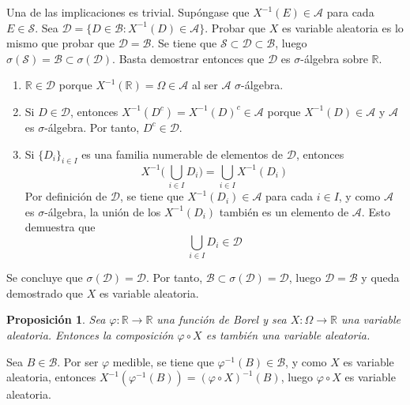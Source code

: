 \documentclass[11pt]{report}
\makeatletter
\renewenvironment{proof}[1][\proofname]{\par
  \pushQED{\qed}%
  \normalfont \topsep\z@skip %
  \trivlist
  \item[\hskip\labelsep
        \itshape
    #1\@addpunct{.}]\ignorespaces
}{%
  \popQED\endtrivlist\@endpefalse
}
\theoremstyle{mytheorem}
\newtheorem{proposition}{Proposición}
\theoremstyle{mydefinition}
\theoremstyle{myexample}
\let\oldproofname=\proofname
\renewcommand{\proofname}{\rm\bf{\oldproofname}}}
\newenvironment{cproposition} %
  {\begin{mdframed}[
        linewidth=3pt,
        linecolor=c2,
        bottomline=false,
        topline=false,
        rightline=false,
        innerrightmargin=0pt,
        innertopmargin=0pt,
        innerbottommargin=0pt,
        innerleftmargin=1em,
        skipabove=\baselineskip]
    \begin{proposition}}
  {\end{proposition}\end{mdframed}}
\newcommand{\R}{\mathbb R}
\makeatother
\begin{document}
\begin{proof}
Una de las implicaciones es trivial. Supóngase que $X^{-1}(E) \in \mathcal{A}$ para cada $E \in \mathcal{S}$. Sea $\mathcal{D} = \{D \in \mathcal{B} \colon X^{-1}(D) \in \mathcal{A}\}$. Probar que $X$ es variable aleatoria es lo mismo que probar que $\mathcal{D} = \mathcal{B}$. Se tiene que $\mathcal{S} \subset \mathcal{D} \subset \mathcal{B}$, luego $\sigma(\mathcal{S}) = \mathcal{B} \subset \sigma(\mathcal{D})$. Basta demostrar entonces que $\mathcal{D}$ es $\sigma$-álgebra sobre $\R$. 

\begin{enumerate}
    \item $\R \in \mathcal{D}$ porque $X^{-1}(\R) = \Omega \in \mathcal{A}$ al ser $\mathcal{A}$ $\sigma$-álgebra.
    \item Si $D \in \mathcal{D}$, entonces $X^{-1}(D^c) = X^{-1}(D)^c \in \mathcal{A}$ porque $X^{-1}(D) \in \mathcal{A}$ y $\mathcal{A}$ es $\sigma$-álgebra. Por tanto, $D^c \in \mathcal{D}$.
    \item Si $\{D_i\}_{i \in I}$ es una familia numerable de elementos de $\mathcal{D}$, entonces
    \[X^{-1}\biggl(\, \bigcup_{i \in I} D_i \biggr) = \bigcup_{i \in I}X^{-1}(D_i)\]
    Por definición de $\mathcal{D}$, se tiene que $X^{-1}(D_i) \in \mathcal{A}$ para cada $i \in I$, y como $\mathcal{A}$ es $\sigma$-álgebra, la unión de los $X^{-1}(D_i)$ también es un elemento de $\mathcal{A}$. Esto demuestra que
    \[\bigcup_{i \in I} D_i \in \mathcal{D}\]
\end{enumerate}

    Se concluye que $\sigma(\mathcal{D}) = \mathcal{D}$. Por tanto, $\mathcal{B} \subset \sigma(\mathcal{D}) = \mathcal{D}$, luego $\mathcal{D} = \mathcal{B}$ y queda demostrado que $X$ es variable aleatoria.
\end{proof}

\begin{cproposition}
\label{prop1.4.}
Sea $\varphi \colon \R \to \R$ una función de Borel y sea $X \colon \Omega \to \R$ una variable aleatoria. Entonces la composición $\varphi \circ X$ es también una variable aleatoria.
\end{cproposition}

\begin{proof}
Sea $B \in \mathcal{B}$. Por ser $\varphi$ medible, se tiene que $\varphi^{-1}(B) \in \mathcal{B}$, y como $X$ es variable aleatoria, entonces $X^{-1}(\varphi^{-1}(B)) = (\varphi \circ X)^{-1}(B)$, luego $\varphi \circ X$ es variable aleatoria.
\end{proof}
\end{document}
